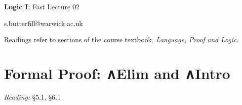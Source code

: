 \documentclass[12pt]{extarticle}
\date{}
\makeatletter
\def \ititle {Origins of Mind}
\def \isubtitle {Lecture 08}
\def \iemail{s.butterfill@warwick.ac.uk}
\makeatother
\begin{document}

\begin{multicols*}{3}

\setlength\footnotesep{1em}








\def \ititle {Logic I}
 
\def \isubtitle {Fast Lecture 02}
 
\begin{center}
 
{\Large
 
\textbf{\ititle}: \isubtitle
 
}
 
 
 
\iemail %
 
\end{center}
 
Readings refer to sections of the course textbook, \emph{Language, Proof and Logic}.
 
 
 
\section{Formal Proof: ∧Elim and ∧Intro}
 
\emph{Reading:} §5.1, §6.1
 

\end{multicols*}
\end{document}
